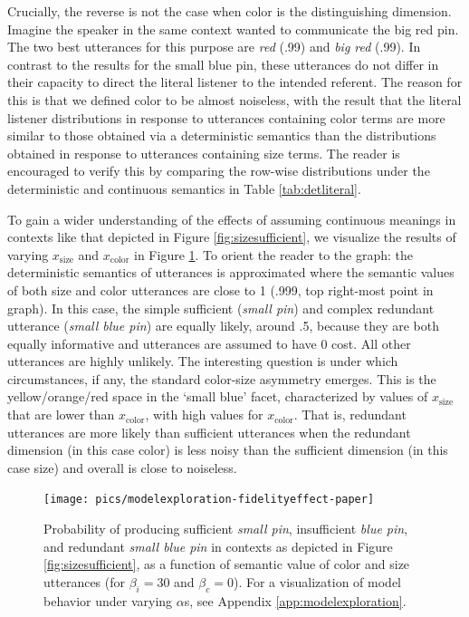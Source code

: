 \documentclass[11pt]{article}
\newcommand{\tableref}[1]{Table \ref{#1}}
\newcommand{\figref}[1]{Figure \ref{#1}}
\newcommand{\appref}[1]{Appendix \ref{#1}}
\begin{document}
Crucially, the reverse is not the case when color is the distinguishing dimension. Imagine the speaker in the same context wanted to communicate the big red pin. The two best utterances for this purpose are \emph{red} (.99) and \emph{big red} (.99). In contrast to the results for the small blue pin, these utterances do not differ in their capacity to direct the literal listener to the intended referent. The reason for this is that we defined color to be almost noiseless, with the result that the literal listener distributions in response to utterances containing color terms are more similar to those obtained via a deterministic semantics than the distributions obtained in response to utterances containing size terms. The reader is encouraged to verify this by comparing the row-wise distributions under the  deterministic and continuous semantics in \tableref{tab:detliteral}.


To gain a wider understanding of the effects of assuming continuous meanings in contexts like that depicted in \figref{fig:sizesufficient}, we visualize the results of varying  $x_{\text{size}}$ and $x_{\text{color}}$ in \figref{fig:basicasymmetry}. To orient the reader to the graph: the deterministic semantics of utterances is approximated where the  semantic values of both size and color utterances are close to 1 (.999, top right-most point in graph).  In this case, the simple sufficient (\emph{small pin}) and complex redundant utterance (\emph{small blue pin}) are equally likely, around .5, because they are both equally informative and utterances are assumed to have 0 cost. All other utterances are highly unlikely. The interesting question is under which circumstances, if any,  the standard color-size asymmetry emerges. This is the yellow/orange/red space in the `small blue' facet, characterized by values of $x_{\text{size}}$ that are lower than $x_{\text{color}}$, with high values for $x_{\text{color}}$. That is, redundant utterances are more likely than sufficient utterances when the redundant dimension (in this case color) is less noisy than the sufficient dimension (in this case size) and overall is close to noiseless. 

\begin{figure}
\centering
\texttt{[image: pics/modelexploration-fidelityeffect-paper]}

\caption{Probability of producing sufficient \emph{small pin}, insufficient \emph{blue pin}, and redundant \emph{small blue pin} in contexts as depicted in \figref{fig:sizesufficient}, as a function of semantic value of color and size utterances (for $\beta_i = 30$ and $ \beta_c = 0$). For a visualization of model behavior under varying $\alpha$s, see \appref{app:modelexploration}.}
\label{fig:basicasymmetry}
\end{figure}
\end{document}
